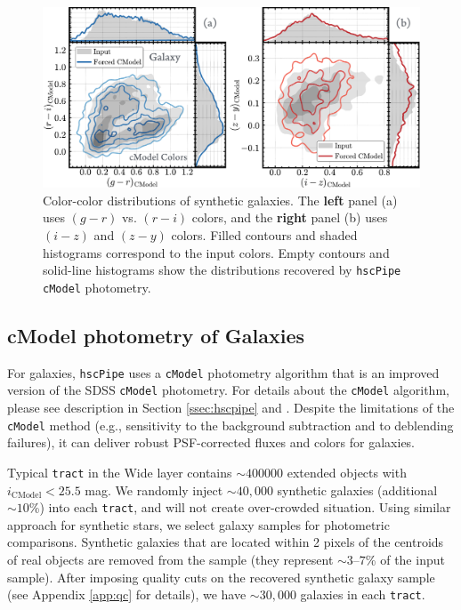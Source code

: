\documentclass[useamsfonts]{pasj01}
\def\hscpipe{\texttt{hscPipe}}
\def\cmodel{\texttt{cModel}}
\def\tract{\texttt{tract}}
\begin{document}
\begin{figure}
    \begin{center}
        \includegraphics[width=\textwidth]{fig/synpipe_galaxy_cdist}
    \end{center}
    \caption{Color-color distributions of synthetic  galaxies.
        The \textbf{left} panel (a) uses $(g-r)$ vs. $(r-i)$ colors, and the 
        \textbf{right} panel (b) uses $(i-z)$ and $(z-y)$ colors. 
        Filled contours and shaded histograms correspond to the input colors. 
        Empty contours and solid-line histograms show the distributions recovered
        by \hscpipe{} \cmodel{} photometry.
        }
    \label{fig:cmodel_cdist}
\end{figure}

\subsection{cModel photometry of Galaxies}
    \label{ssec:cmodel}

    For galaxies, \hscpipe{} uses a \cmodel{} photometry algorithm that is an improved 
    version of the SDSS \cmodel{} photometry.
    For details about the \cmodel{} algorithm, please see description in Section 
    \ref{ssec:hscpipe} and \citet{Bosch2017}.
    Despite the limitations of the \cmodel{} method (e.g., sensitivity to the 
    background subtraction and to deblending failures), it can deliver robust 
    PSF-corrected fluxes and colors for galaxies.

    Typical \tract{} in the Wide layer contains ${\sim}400000$ extended objects with 
    $i_{\mathrm{CModel}} < 25.5$ mag. 
    We randomly inject ${\sim}40,000$ synthetic galaxies (additional ${\sim}10$\%) 
    into each \tract{}, and will not create over-crowded situation.
    Using similar approach for synthetic stars, we select galaxy samples for 
    photometric comparisons. 
    Synthetic galaxies that are located within 2 pixels of the centroids of real 
    objects are removed from the sample (they represent ${\sim}3$--$7$\% of the 
    input sample). 
    After imposing quality cuts on the recovered synthetic galaxy sample 
    (see Appendix \ref{app:qc} for details), we have ${\sim}30,000$ galaxies in 
    each \tract{}.
    
\end{document}
